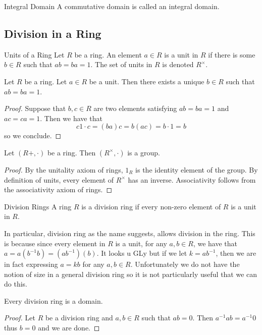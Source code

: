 \documentclass[a4paper]{article}
\begin{document}
\begin{defn}{Integral Domain}{} A commutative domain is called an integral domain. 
\end{defn}

\subsection{Division in a Ring}
\begin{defn}{Units of a Ring}{} Let $R$ be a ring. An element $a\in R$ is a unit in $R$ if there is some $b\in R$ such that $ab=ba=1$. The set of units in $R$ is denoted $R^\times$. 
\end{defn}

\begin{lmm}{}{} Let $R$ be a ring. Let $a\in R$ be a unit. Then there exists a unique $b\in R$ such that $ab=ba=1$. 
\begin{proof}
Suppose that $b,c\in R$ are two elements satisfying $ab=ba=1$ and $ac=ca=1$. Then we have that $$c1\cdot c=(ba)c=b(ac)=b\cdot 1=b$$ so we conclude. 
\end{proof}
\end{lmm}

\begin{prp}{}{} Let $(R+,\cdot)$ be a ring. Then $(R^\times,\cdot)$ is a group. 
\begin{proof}
By the unitality axiom of rings, $1_R$ is the identity element of the group. By definition of units, every element of $R^\times$ has an inverse. Associativity follows from the associativity axiom of rings. 
\end{proof}
\end{prp}

\begin{defn}{Division Rings}{} A ring $R$ is a division ring if every non-zero element of $R$ is a unit in $R$. 
\end{defn}

In particular, division ring as the name suggests, allows division in the ring. This is because since every element in $R$ is a unit, for any $a,b\in R$, we have that $a=a(b^{-1}b)=(ab^{-1})(b)$. It looks u GLy but if we let $k=ab^{-1}$, then we are in fact expressing $a=kb$ for any $a,b\in R$. Unfortunately we do not have the notion of size in a general division ring so it is not particularly useful that we can do this. \\

\begin{prp}{}{} Every division ring is a domain. 
\begin{proof}
Let $R$ be a division ring and $a,b\in R$ such that $ab=0$. Then $a^{-1}ab=a^{-1}0$ thus $b=0$ and we are done. 
\end{proof}
\end{prp}
\end{document}
